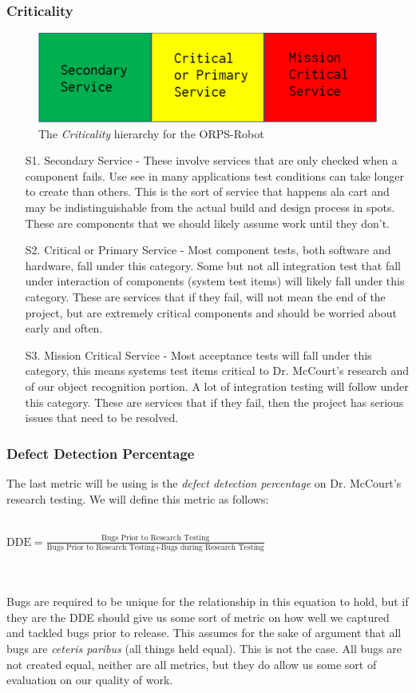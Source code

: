 \documentclass[english,12pt]{article}
\begin{document}
\subsubsection{Criticality}
\begin{figure}[h!]
    \centerline{\includegraphics[width = \textwidth]{crit.jpg}}
    \caption{The \textit{Criticality} hierarchy for the ORPS-Robot}
\end{figure}
\begin{itemize}
    \item[S1.] Secondary Service - These involve services that are only checked when a component 
    fails. Use see in many applications test conditions can take longer to create than others. 
    This is the sort of service that happens ala cart and may be indistinguishable from the actual 
    build and design process in spots. These are components that we should likely assume work until 
    they don't.
    \item[S2.] Critical or Primary Service - Most component tests, both software and hardware, 
    fall under this category. Some but not all integration test that fall under interaction of 
    components (system test items) will likely fall under this category. These are services that 
    if they fail, will not mean the end of the project, but are extremely critical components 
    and should be worried about early and often.
    \item[S3.] Mission Critical Service - Most acceptance tests will fall under this category, this 
    means systems test items critical to Dr. McCourt’s research and of our object recognition 
    portion. A lot of integration testing will follow under this category. These are services 
    that if they fail, then the project has serious issues that need to be resolved.
\end{itemize}
\subsubsection{Defect Detection Percentage}
The last metric will be using is the \textit{defect detection percentage} on Dr. McCourt's 
research testing. We will define this metric as follows:\\\\
\centerline{$\text{DDE} = \frac{\text{Bugs Prior to Research Testing}}{\text{Bugs Prior to Research Testing} + \text{Bugs during Research Testing}}$}
\\\\
Bugs are required to be unique for the relationship in this equation to hold, but if they are the DDE should 
give us some sort of metric on how well we captured and tackled bugs prior to release. This 
assumes for the sake of argument that all bugs are \textit{ceteris paribus} (all things held equal).
This is not the case. All bugs are not created equal, neither are all metrics, but they do 
allow us some sort of evaluation on our quality of work.
\end{document}
